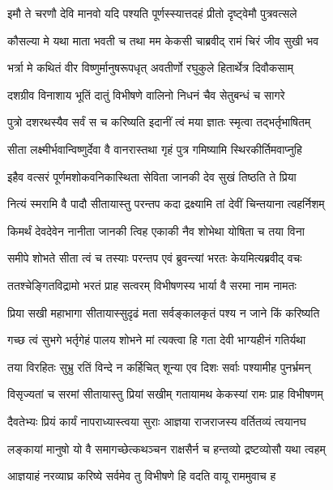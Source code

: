 \twolineshloka
{इमौ ते चरणौ देवि मानवो यदि पश्यति}
{पूर्णस्स्यात्तदहं प्रीतो दृष्ट्वेमौ पुत्रवत्सले}%

\twolineshloka
{कौसल्या मे यथा माता भवती च तथा मम}
{केकसी चाब्रवीद् रामं चिरं जीव सुखी भव}%

\twolineshloka
{भर्त्रा मे कथितं वीर विष्णुर्मानुषरूपधृत्}
{अवतीर्णो रघुकुले हितार्थेत्र दिवौकसाम्}%

\twolineshloka
{दशग्रीव विनाशाय भूतिं दातुं विभीषणे}
{वालिनो निधनं चैव सेतुबन्धं च सागरे}%

\twolineshloka
{पुत्रो दशरथस्यैव सर्वं स च करिष्यति}
{इदानीं त्वं मया ज्ञातः स्मृत्वा तद्भर्तृभाषितम्}%

\twolineshloka
{सीता लक्ष्मीर्भवान्विष्णुर्देवा वै वानरास्तथा}
{गृहं पुत्र गमिष्यामि स्थिरकीर्तिमवाप्नुहि}%


\twolineshloka
{इहैव वत्सरं पूर्णमशोकवनिकास्थिता}
{सेविता जानकी देव सुखं तिष्ठति ते प्रिया}%

\twolineshloka
{नित्यं स्मरामि वै पादौ सीतायास्तु परन्तप}
{कदा द्रक्ष्यामि तां देवीं चिन्तयाना त्वहर्निशम्}%

\twolineshloka
{किमर्थं देवदेवेन नानीता जानकी त्विह}
{एकाकी नैव शोभेथा योषिता च तया विना}%

\twolineshloka
{समीपे शोभते सीता त्वं च तस्याः परन्तप}
{एवं ब्रुवन्त्यां भरतः केयमित्यब्रवीद् वचः}%

\twolineshloka
{ततश्चेङ्गितविद्रामो भरतं प्राह सत्वरम्}
{विभीषणस्य भार्या वै सरमा नाम नामतः}%

\twolineshloka
{प्रिया सखी महाभागा सीतायास्सुदृढं मता}
{सर्वङ्कालकृतं पश्य न जाने किं करिष्यति}%

\twolineshloka
{गच्छ त्वं सुभगे भर्तृगेहं पालय शोभने}
{मां त्यक्त्वा हि गता देवी भाग्यहीनं गतिर्यथा}%

\twolineshloka
{तया विरहितः सुभ्रु रतिं विन्दे न कर्हिचित्}
{शून्या एव दिशः सर्वाः पश्यामीह पुनर्भ्रमन्}%

\twolineshloka
{विसृज्यतां च सरमां सीतायास्तु प्रियां सखीम्}
{गतायामथ केकस्यां रामः प्राह विभीषणम्}%

\twolineshloka
{दैवतेभ्यः प्रियं कार्यं नापराध्यास्त्वया सुराः}
{आज्ञया राजराजस्य वर्तितव्यं त्वयानघ}%

\twolineshloka
{लङ्कायां मानुषो यो वै समागच्छेत्कथञ्चन}
{राक्षसैर्न च हन्तव्यो द्रष्टव्योसौ यथा त्वहम्}%


\twolineshloka
{आज्ञयाहं नरव्याघ्र करिष्ये सर्वमेव तु}
{विभीषणे हि वदति वायू राममुवाच ह}%

